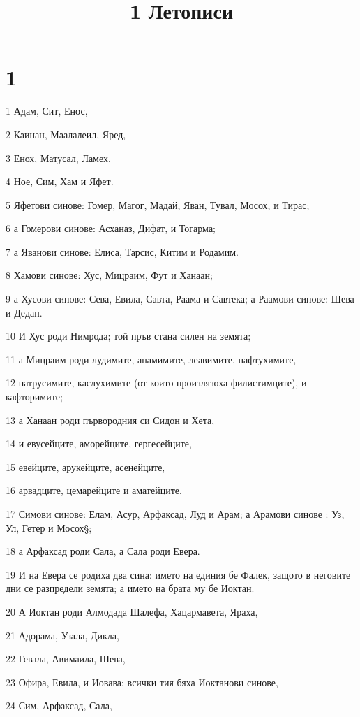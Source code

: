 

\title{1 Летописи}


\chapter{1}

\par 1 Адам, Сит, Енос,
\par 2 Каинан, Маалалеил, Яред,
\par 3 Енох, Матусал, Ламех,
\par 4 Ное, Сим, Хам и Яфет.
\par 5 Яфетови синове: Гомер, Магог, Мадай, Яван, Тувал, Мосох, и Тирас;
\par 6 а Гомерови синове: Асханаз, Дифат, и Тогарма;
\par 7 а Яванови синове: Елиса, Тарсис, Китим и Родамим.
\par 8 Хамови синове: Хус, Мицраим, Фут и Ханаан;
\par 9 а Хусови синове: Сева, Евила, Савта, Раама и Савтека; а Раамови синове: Шева и Дедан.
\par 10 И Хус роди Нимрода; той пръв стана силен на земята;
\par 11 а Мицраим роди лудимите, анамимите, леавимите, нафтухимите,
\par 12 патрусимите, каслухимите (от които произлязоха филистимците), и кафторимите;
\par 13 а Ханаан роди първородния си Сидон и Хета,
\par 14 и евусейците, аморейците, гергесейците,
\par 15 евейците, арукейците, асенейците,
\par 16 арвадците, цемарейците и аматейците.
\par 17 Симови синове: Елам, Асур, Арфаксад, Луд и Арам; а Арамови синове : Уз, Ул, Гетер и Мосох§;
\par 18 а Арфаксад роди Сала, а Сала роди Евера.
\par 19 И на Евера се родиха два сина: името на единия бе Фалек, защото в неговите дни се разпредели земята; а името на брата му бе Иоктан.
\par 20 А Иоктан роди Алмодада Шалефа, Хацармавета, Яраха,
\par 21 Адорама, Узала, Дикла,
\par 22 Гевала, Авимаила, Шева,
\par 23 Офира, Евила, и Иовава; всички тия бяха Иоктанови синове,
\par 24 Сим, Арфаксад, Сала,
